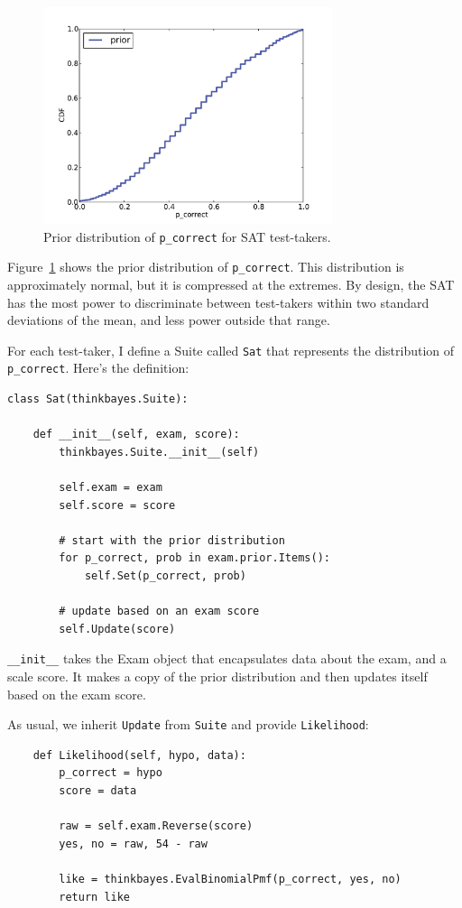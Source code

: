 \documentclass[12pt]{book}
\begin{document}
\begin{figure}
\centerline{\includegraphics[height=2.5in]{figs/sat_prior.pdf}}
\caption{Prior distribution of {\tt p\_correct} for SAT test-takers.}
\label{fig.satprior}
\end{figure}

Figure~\ref{fig.satprior} shows the prior distribution of
\verb"p_correct".  This distribution is approximately normal, but it
is compressed at the extremes.  By design, the SAT has the most power
to discriminate between test-takers within two standard deviations of
the mean, and less power outside that range.

For each test-taker, I define a Suite called {\tt Sat} that
represents the distribution of \verb"p_correct".  Here's the definition:

\begin{verbatim}
class Sat(thinkbayes.Suite):

    def __init__(self, exam, score):
        thinkbayes.Suite.__init__(self)

        self.exam = exam
        self.score = score

        # start with the prior distribution
        for p_correct, prob in exam.prior.Items():
            self.Set(p_correct, prob)

        # update based on an exam score
        self.Update(score)
\end{verbatim}

\verb"__init__" takes the Exam object that encapsulates data
about the exam, and a scale score.  It makes a copy of the
prior distribution and then updates itself based on the exam
score.

As usual, we inherit {\tt Update} from {\tt Suite} and provide
{\tt Likelihood}:

\begin{verbatim}
    def Likelihood(self, hypo, data):
        p_correct = hypo
        score = data

        raw = self.exam.Reverse(score)
        yes, no = raw, 54 - raw

        like = thinkbayes.EvalBinomialPmf(p_correct, yes, no)
        return like
\end{verbatim}
\end{document}
